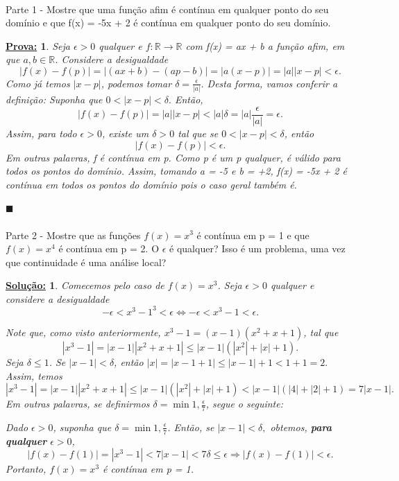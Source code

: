 \documentclass{article}
\newtheorem*{sol*}{\underline{Solu\c c\~ao:}}
\newtheorem*{proof*}{\underline{Prova:}}
\renewcommand\qedsymbol{$\blacksquare$}
\begin{document}
\paragraph{} Parte 1 - Mostre que uma fun\c c\~ao afim \'e cont\'inua em qualquer ponto do seu dom\'inio e que f(x) = -5x + 2 \'e cont\'inua em qualquer ponto do seu dom\'inio.
\begin{proof*}
	Seja $\epsilon > 0$ qualquer e $f:\mathbb{R}\rightarrow\mathbb{R}$ com f(x) = ax + b a fun\c c\~ao afim, em que $a, b\in\mathbb{R}$. Considere a desigualdade
	$$
		|f(x) - f(p)| = |(ax + b) - (ap - b)| = |a(x - p)| = |a||x - p|< \epsilon.
	$$
	Como j\'a temos $|x - p|$, podemos tomar $\delta = \frac{\epsilon}{|a|}.$ Desta forma, vamos conferir a defini\c c\~ao: Suponha que $0 < |x - p| < \delta.$ Ent\~ao,
	$$
		|f(x) - f(p)| = |a||x - p| < |a|\delta = |a|\frac{\epsilon}{|a|} = \epsilon.
	$$
	Assim, para todo $\epsilon > 0$, existe um $\delta > 0$ tal que se $0 < |x - p| < \delta$, ent\~ao
	$$
		|f(x) - f(p)| < \epsilon.
	$$
	Em outras palavras, f \'e cont\'inua em p. Como p \'e um p qualquer, \'e v\'alido para todos os pontos do dom\'inio. Assim, tomando a = -5 e b = +2, f(x) = -5x + 2 \'e cont\'inua em todos os pontos do dom\'inio pois o caso geral tamb\'em \'e.

	\qedsymbol
\end{proof*}

\paragraph{} Parte 2 - Mostre que as fun\c c\~oes $f(x) = x^3$ \'e cont\'inua em p = 1 e que $f(x) = x^4$ \'e cont\'inua em p = 2. O $\epsilon$ \'e qualquer? Isso \'e um problema, uma vez que continuidade \'e uma an\'alise local?
\begin{sol*}
	Comecemos pelo caso de $f(x) = x^3$. Seja $\epsilon > 0$ qualquer e considere a desigualdade
	$$
		-\epsilon < x^3 - 1^3 < \epsilon \Leftrightarrow -\epsilon < x^3 - 1 < \epsilon.
	$$

	Note que, como visto anteriormente, $x^3 - 1 = (x - 1)(x^2 + x + 1)$, tal que
	$$
		|x^3 - 1| = |x - 1||x^2 + x + 1| \leq |x - 1|(|x^2| + |x| + 1).
	$$
	Seja $\delta \leq 1$. Se $|x - 1| < \delta$, ent\~ao $|x| = |x - 1 + 1| \leq |x - 1| + 1 < 1 + 1 = 2.$ Assim, temos
	$$
		|x^3 - 1| = |x - 1||x^2 + x + 1| \leq |x - 1|(|x^2| + |x| + 1) < |x-1|(|4| + |2| + 1) = 7|x - 1|.
	$$
	Em outras palavras, se definirmos $\delta = \min{1,\frac{\epsilon}{7}}$, segue o seguinte:

	Dado $\epsilon > 0$, suponha que $\delta = \min{1, \frac{\epsilon}{7}}$. Ent\~ao, se $|x - 1| < \delta,$ obtemos, \textbf{para qualquer} $\epsilon > 0$,
	$$
		|f(x) - f(1)| = |x^3 - 1| < 7|x - 1| < 7\delta \leq \epsilon \Rightarrow |f(x) - f(1)| < \epsilon.
	$$
	Portanto, $f(x) = x^3$ \'e cont\'inua em p = 1.

\end{sol*}
\end{document}
